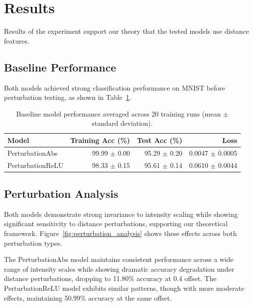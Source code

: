 \section{Results}

Results of the experiment support our theory that the tested models use distance features.

\subsection{Baseline Performance}


Both models achieved strong classification performance on MNIST before perturbation testing, as shown in Table~\ref{tab:baseline}.

\begin{table}[h]
\centering
\begin{tabular}{lrrr}
\hline
Model & Training Acc (\%) & Test Acc (\%) & Loss \\
\hline
PerturbationAbs & 99.99 $\pm$ 0.00 & 95.29 $\pm$ 0.20 & 0.0047 $\pm$ 0.0005 \\
PerturbationReLU & 98.33 $\pm$ 0.15 & 95.61 $\pm$ 0.14 & 0.0610 $\pm$ 0.0044 \\
\hline
\end{tabular}
\caption{Baseline model performance averaged across 20 training runs (mean $\pm$ standard deviation).}
\label{tab:baseline}
\end{table}

\subsection{Perturbation Analysis}

Both models demonstrate strong invariance to intensity scaling while showing significant sensitivity to distance perturbations, supporting our theoretical framework. Figure~\ref{fig:perturbation_analysis} shows these effects across both perturbation types.

The PerturbationAbs model maintains consistent performance across a wide range of intensity scales while showing dramatic accuracy degradation under distance perturbations, dropping to 11.80\% accuracy at 0.4 offset. The PerturbationReLU model exhibits similar patterns, though with more moderate effects, maintaining 50.99\% accuracy at the same offset.

